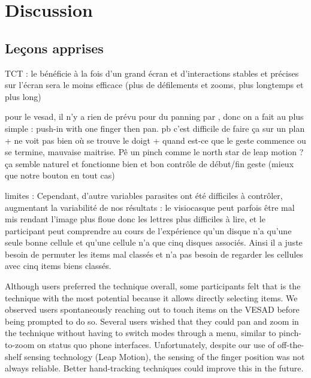 \chapter{Discussion}
\label{ch:discussion}

\section{Leçons apprises}
\label{sec:discussion_lessons}

TCT : le  bénéficie à la fois d'un grand écran \citep{Liu2014} et d'interactions stables et précises sur l'écran \citep{Jones2012}
 sera le moins efficace (plus de défilements et zooms, plus longtemps et plus long)

pour le vesad, il n'y a rien de prévu pour du panning par \cite{Piumsomboon2013}, donc on a fait au plus simple : push-in with one finger then pan. pb c'est difficile de faire ça sur un plan + ne voit pas bien où se trouve le doigt + quand est-ce que le geste commence ou se termine, mauvaise maitrise. Pê un pinch comme le north star de leap motion ? ça semble naturel et fonctionne bien et bon contrôle de début/fin geste (mieux que notre bouton en tout cas)

limites : Cependant, d'autre variables parasites ont été difficiles à contrôler, augmentant la variabilité de nos résultats : le visiocasque peut parfois être mal mis rendant l'image plus floue donc les lettres plus difficiles à lire, et le participant peut comprendre au cours de l'expérience qu'un disque n'a qu'une seule bonne cellule et qu'une cellule n'a que cinq disques associés. Ainsi il a juste besoin de permuter les items mal classés et n'a pas besoin de regarder les cellules avec cinq items biens classés.

Although users preferred the  technique overall, some participants felt that  is the technique with the most potential because it allows directly selecting items. We observed users spontaneously reaching out to touch items on the VESAD before being prompted to do so. Several users wished that they could pan and zoom in the  technique without having to switch modes through a menu, similar to pinch-to-zoom on status quo phone interfaces. Unfortunately, despite our use of off-the-shelf sensing technology (Leap Motion), the sensing of the finger position was not always reliable. Better hand-tracking techniques \cite{Taylor2016} could improve this in the future.

